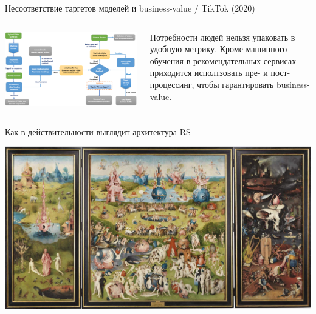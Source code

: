 \documentclass[11pt,aspectratio=169,handout]{beamer}
\begin{document}
\begin{frame}{Несоответствие таргетов моделей и business-value / TikTok (2020) \cite{TIK}}
\begin{columns}
\begin{column}{0.6\textwidth}
   \begin{center}
		\includegraphics[scale=0.24]{images/tiktok.png}
   \end{center}
\end{column}
\begin{column}{0.35\textwidth}
    \begin{small}
    \begin{tcolorbox}[colback=info!5,colframe=info!80,title=]
    Потребности людей нельзя упаковать в удобную метрику. Кроме машинного обучения  в рекомендательных сервисах приходится исполтзовать пре- и пост-процессинг, чтобы гарантировать business-value.
    \end{tcolorbox}
    \end{small}
\end{column}
\end{columns}

\end{frame}

\begin{frame}{Как в действительности выглядит архитектура RS}

\begin{center}
\includegraphics[scale=0.15]{images/bosch.jpeg}
\end{center}

\end{frame}
\end{document}
